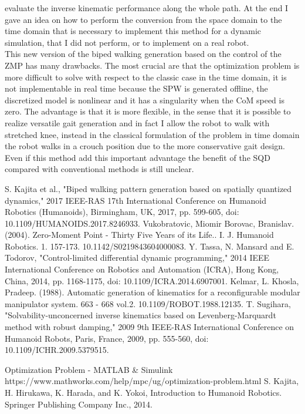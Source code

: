 \documentclass[a4paper]{article}
\begin{document}
evaluate the  inverse kinematic performance along the whole path. At the end I gave an idea on how to perform the conversion from the space domain to the time domain that is necessary to implement this method for a dynamic simulation, that I did not perform, or to implement on a real robot.\\
This new version of the biped walking generation based on the control of the ZMP has many drawbacks. The most crucial are that the optimization problem is more difficult to solve with respect to the classic case in the time domain, it is not implementable in real time because the SPW is generated offline, the discretized model is nonlinear and it has a singularity when the CoM speed is zero. The advantage is that it is more flexible, in the sense that it is possible to realize versatile gait generation and in fact I allow the robot to walk with stretched knee, instead in the classical formulation of the problem in time domain the robot walks in a crouch position due to the more conservative gait design. Even if this method add this important advantage the benefit of the SQD compared with conventional methods is still unclear.


\newpage

\begin{thebibliography}{7}
 S. Kajita et al., "Biped walking pattern generation based on spatially quantized dynamics," 2017 IEEE-RAS 17th International Conference on Humanoid Robotics (Humanoids), Birmingham, UK, 2017, pp. 599-605, doi: 10.1109/HUMANOIDS.2017.8246933.
Vukobratovic, Miomir  Borovac, Branislav. (2004). Zero-Moment Point - Thirty Five Years of its Life.. I. J. Humanoid Robotics. 1. 157-173. 10.1142/S0219843604000083. 
  Y. Tassa, N. Mansard and E. Todorov, "Control-limited differential dynamic programming," 2014 IEEE International Conference on Robotics and Automation (ICRA), Hong Kong, China, 2014, pp. 1168-1175, doi: 10.1109/ICRA.2014.6907001.
Kelmar, L.  Khosla, Pradeep. (1988). Automatic generation of kinematics for a reconfigurable modular manipulator system. 663 - 668 vol.2. 10.1109/ROBOT.1988.12135. 
 T. Sugihara, "Solvability-unconcerned inverse kinematics based on Levenberg-Marquardt method with robust damping," 2009 9th IEEE-RAS International Conference on Humanoid Robots, Paris, France, 2009, pp. 555-560, doi: 10.1109/ICHR.2009.5379515.

 Optimization Problem - MATLAB \& Simulink https://www.mathworks.com/help/mpc/ug/optimization-problem.html
S. Kajita, H. Hirukawa, K. Harada, and K. Yokoi, Introduction to Humanoid Robotics. Springer Publishing Company Inc., 2014.
\end{thebibliography} 
\end{document}
